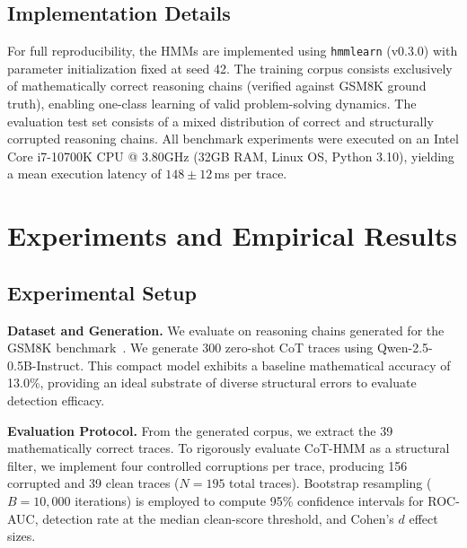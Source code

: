 \documentclass{llncs}
\begin{document}
\subsection{Implementation Details}

For full reproducibility, the HMMs are implemented using \texttt{hmmlearn} (v0.3.0) with parameter initialization fixed at seed 42. The training corpus consists exclusively of mathematically correct reasoning chains (verified against GSM8K ground truth), enabling one-class learning of valid problem-solving dynamics. The evaluation test set consists of a mixed distribution of correct and structurally corrupted reasoning chains. All benchmark experiments were executed on an Intel Core i7-10700K CPU @ 3.80GHz (32GB RAM, Linux OS, Python 3.10), yielding a mean execution latency of $148 \pm 12$\,ms per trace.

\section{Experiments and Empirical Results}

\subsection{Experimental Setup}

\textbf{Dataset and Generation.} We evaluate on reasoning chains generated for the GSM8K benchmark~\cite{cobbe2021training}. We generate 300 zero-shot CoT traces using Qwen-2.5-0.5B-Instruct. This compact model exhibits a baseline mathematical accuracy of 13.0\%, providing an ideal substrate of diverse structural errors to evaluate detection efficacy.

\textbf{Evaluation Protocol.} From the generated corpus, we extract the 39 mathematically correct traces. To rigorously evaluate CoT-HMM as a structural filter, we implement four controlled corruptions per trace, producing 156 corrupted and 39 clean traces ($N=195$ total traces). Bootstrap resampling ($B=10{,}000$ iterations) is employed to compute 95\% confidence intervals for ROC-AUC, detection rate at the median clean-score threshold, and Cohen's $d$ effect sizes.
\end{document}
